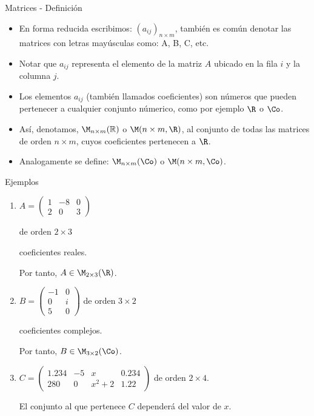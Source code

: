 {Matrices - Definición}

\begin{itemize}
  \item
  En forma reducida escribimos: $(a_{ij})_{n\times m}$, también es 
  común denotar las matrices con letras mayúsculas como: A, B, C, etc.
  \item
  Notar que  $a_{ij}$ representa el elemento de la matriz $A$ ubicado en la fila $i$ y la columna $j$.
  \item
  Los elementos $a_{ij}$ (también llamados coeficientes) son números que pueden pertenecer a cualquier conjunto númerico, como por ejemplo $\R$ o  $\Co$.
  \item
  Así, denotamos,  $\M_{n\times m}(\mathbb{R})$ o  $\M(n\times m, \R)$, al conjunto de todas las matrices de orden $n \times m$, cuyos coeficientes pertenecen a $\R$.
  \item
  Analogamente se define:  $\M_{n\times m}(\Co)$ o  $\M(n\times m, \Co)$.
\end{itemize}


{Ejemplos}
\begin{enumerate}
\item
$ A = \left(
\begin{array}{ccc}
1 & -8 & 0\\
2 & 0 & 3
\end{array}
\right)
$

 de orden $2 \times 3$

coeficientes reales.


Por tanto, $A \in \M_ {2 \times 3}(\R)$.


\item
$ B = \left(
\begin{array}{cc}
-1 & 0\\
0  & i\\
5 & 0
\end{array}
\right)
$
 de orden $3 \times 2$

coeficientes complejos.

Por tanto, $B \in \M_ {3 \times 2}(\Co)$.

\item
$C = \left(
\begin{array}{cccc}
1. 234 & -5 & x & 0.234\\
280 & 0 & x^2+2 & 1.22
\end{array}
\right)
$
 de orden $2 \times 4$.

El conjunto al que pertenece  $C$ dependerá del valor de $x$.
\end{enumerate}


